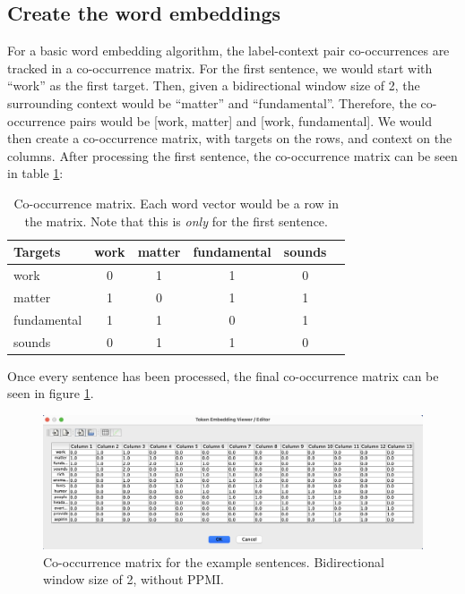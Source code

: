 \subsection{Create the word embeddings}

For a  basic word embedding algorithm, the label-context pair co-occurrences are tracked in a co-occurrence matrix. For the first sentence, we would start with ``work'' as the first target. Then, given a bidirectional window size of 2, the surrounding context would be ``matter'' and ``fundamental''. Therefore, the co-occurrence pairs would be [work, matter] and [work, fundamental]. We would then create a co-occurrence matrix, with targets on the rows, and context on the columns.  After processing the first sentence, the co-occurrence matrix can be seen in table \ref{exampleCoocmat}:

\begin{table}[h]
    \centering
    \begin{tabular}{|l|c|c|c|c|c|}
    \hline
    Targets & work & matter & fundamental & sounds \\
    \hline
    work & 0 & 1 & 1 & 0 \\
    \hline
    matter & 1 & 0 & 1 & 1  \\
    \hline
    fundamental & 1 & 1 & 0 & 1  \\
    \hline
    sounds & 0 & 1 & 1 & 0  \\
    \hline
    \end{tabular}
    \caption{Co-occurrence matrix. Each word vector would be a row in the matrix. Note that this is \textit{only} for the first sentence.}
    \label{exampleCoocmat}
\end{table}

Once every sentence has been processed, the final co-occurrence matrix can be seen in figure \ref{coocExample}.

\begin{figure}[h]
    \centering
    \includegraphics[scale=0.4]{./images/full_cooc_matrix.png}
    \caption[Generated using Simbrain.]{Co-occurrence matrix for the example sentences. Bidirectional window size of 2, without PPMI.}
 \label{coocExample}
\end{figure}


